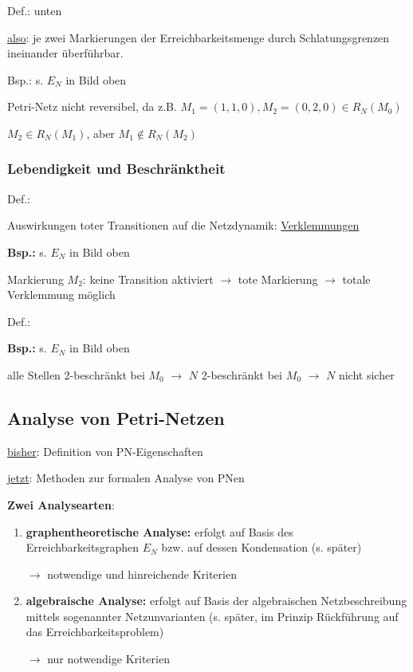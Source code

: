 
Def.:  unten

\underline{also}: je zwei Markierungen der Erreichbarkeitsmenge durch Schlatungsgrenzen ineinander überführbar.

Bsp.: s. $E_N$ in Bild oben

Petri-Netz nicht reversibel, da z.B. $M_1 = (1,1,0), M_2 = (0,2,0) \in R_N(M_0)$

$M_2 \in R_N(M_1)$, aber $M_1\notin R_N(M_2)$ 

\subsubsection{Lebendigkeit und Beschränktheit}
Def.: 

Auswirkungen toter Transitionen auf die Netzdynamik: \underline{Verklemmungen} 

\textbf{Bsp.:} s. $E_N$ in Bild oben

Markierung $M_2$: keine Transition aktiviert $\rightarrow$ tote Markierung $\rightarrow$ totale Verklemmung möglich

Def.: 

\textbf{Bsp.:} s. $E_N$ in Bild oben

alle Stellen 2-beschränkt bei $M_0$ $\rightarrow$ $N$ 2-beschränkt bei $M_0$ $\rightarrow$ $N$ nicht sicher 

\subsection{Analyse von Petri-Netzen}
\underline{bisher}: Definition von PN-Eigenschaften

\underline{jetzt}: Methoden zur formalen Analyse von PNen

\textbf{Zwei Analysearten}:

\begin{enumerate}
	\item{\textbf{graphentheoretische Analyse:}} erfolgt auf Basis des Erreichbarkeitsgraphen $E_N$ bzw. auf dessen Kondensation (s. später) 
	
	$\rightarrow$ notwendige und hinreichende Kriterien
	
	\item{\textbf{algebraische Analyse:}} erfolgt auf Basis der algebraischen Netzbeschreibung mittels sogenannter Netzunvarianten (s. später, im Prinzip Rückführung auf das Erreichbarkeitsproblem)
	
	$\rightarrow$ nur notwendige Kriterien
\end{enumerate}

